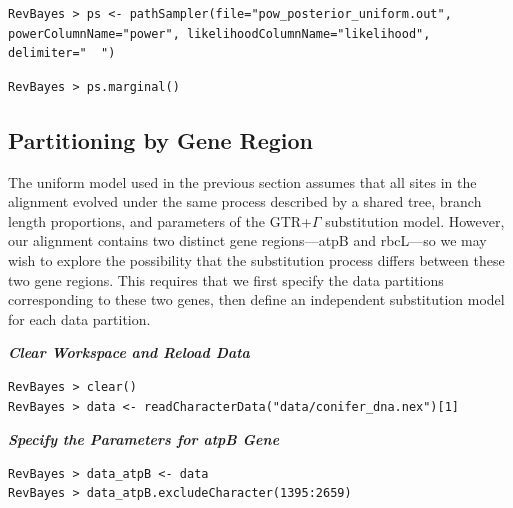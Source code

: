 \documentclass[11pt]{article}
\begin{document}
{\tt \small \begin{snugshade*}
\begin{lstlisting}
RevBayes > ps <- pathSampler(file="pow_posterior_uniform.out", powerColumnName="power", likelihoodColumnName="likelihood", delimiter="	")
\end{lstlisting}
\end{snugshade*}}

{\tt \begin{snugshade*}
\begin{lstlisting}
RevBayes > ps.marginal() 
\end{lstlisting}
\end{snugshade*}}








\bigskip
\subsection{Partitioning by Gene Region}\label{secByGene}

The uniform model used in the previous section assumes that all sites in the alignment evolved under the same process described by a shared tree, branch length proportions, and parameters of the GTR+$\Gamma$ substitution model.
However, our alignment contains two distinct gene regions---atpB and rbcL---so we may wish to explore the possibility that the substitution process differs between these two gene regions.
This requires that we first specify the data partitions corresponding to these two genes, then define an independent substitution model for each data partition. 

\textbf{\textit{Clear Workspace and Reload Data}}

{\tt \begin{snugshade*}
\begin{lstlisting}
RevBayes > clear()
RevBayes > data <- readCharacterData("data/conifer_dna.nex")[1]
\end{lstlisting}
\end{snugshade*}}

\textbf{\textit{Specify the Parameters for atpB Gene}}

{\tt \begin{snugshade*}
\begin{lstlisting}
RevBayes > data_atpB <- data
RevBayes > data_atpB.excludeCharacter(1395:2659)
\end{lstlisting}
\end{snugshade*}}
\end{document}
